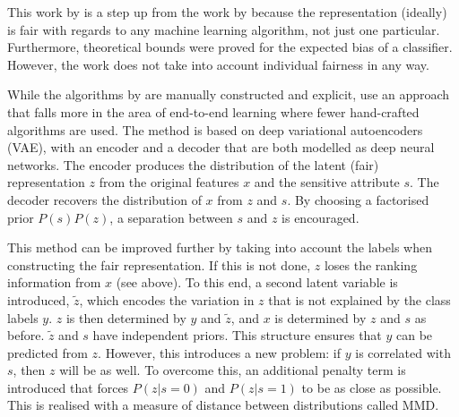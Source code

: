
This work by \citet{feldman2015certifying} is a step up from the work by \citet{zemel2013learning}
because the representation (ideally) is fair with regards to any machine learning algorithm, not just one particular.
Furthermore, theoretical bounds were proved for the expected bias of a classifier.
However, the work does not take into account individual fairness in any way.

While the algorithms by \citet{feldman2015certifying} are manually constructed and explicit,
\citet{louizos2016variational} use an approach
that falls more in the area of end-to-end learning where fewer hand-crafted algorithms are used.
The method is based on deep variational autoencoders (VAE),
with an encoder and a decoder that are both modelled as deep neural networks.
The encoder produces the distribution of the latent (fair) representation \(z\)
from the original features \(x\) and the sensitive attribute \(s\).
The decoder recovers the distribution of \(x\) from \(z\) and \(s\).
By choosing a factorised prior \(P(s)P(z)\), a separation between \(s\) and \(z\) is encouraged.

This method can be improved further by taking into account the labels
when constructing the fair representation.
If this is not done, \(z\) loses the ranking information from \(x\) (see \citet{feldman2015certifying} above).
To this end, a second latent variable is introduced, \(\tilde{z}\),
which encodes the variation in \(z\) that is not explained by the class labels \(y\).
\(z\) is then determined by \(y\) and \(\tilde{z}\),
and \(x\) is determined by \(z\) and \(s\) as before.
\(\tilde{z}\) and \(s\) have independent priors.
This structure ensures that \(y\) can be predicted from \(z\).
However, this introduces a new problem:
if \(y\) is correlated with \(s\), then \(z\) will be as well.
To overcome this, an additional penalty term is introduced that forces \(P(z|s=0)\)
and \(P(z|s=1)\) to be as close as possible.
This is realised with a measure of distance between distributions called \acf{MMD}.

